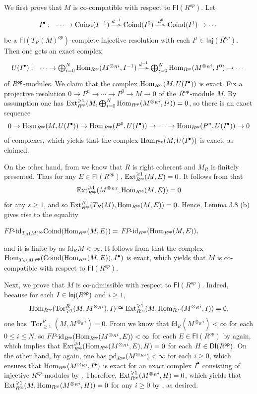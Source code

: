 \documentclass[10pt,twoside]{amsart}
\theoremstyle{bfupright head,slanted body}
\theoremstyle{bfupright head,upright body}
\theoremstyle{fixed bf head,slanted body}
\theoremstyle{fixed bf head,upright body}
\theoremstyle{numbered paragraph}
\newenvironment{prf*}[1][Proof]{%
  \begin{proof}[\bf #1]
    \setcounter{equation}{0}
    \renewcommand{\theequation}{\arabic{equation}}}
  {\end{proof}
  }
\numberwithin{equation}{res}
\newcommand{\DI}{\mathsf{DI}}
\newcommand{\id}{\mathrm{id}}
\newcommand{\fd}{\mathrm{fd}}
\newcommand{\pd}{\mathrm{pd}}
\newcommand{\Inj}{\mathsf{Inj}}
\newcommand{\FI}{\mathsf{FI}}
\newcommand{\Coind}{\mathrm{Coind}}
\newcommand{\Rop}{R^{\sf op}}
\newcommand{\op}{\sf op}
\newcommand{\Hom}{\operatorname{Hom}}
\newcommand{\Ext}{\operatorname{Ext}}
\newcommand{\Tor}{\operatorname{Tor}}
\newcommand{\is}{\cong}
\begin{document}
\begin{prf*}
We first prove that $M$ is co-compatible with respect to $\FI(R^{op})$. Let
$$I^\bullet:\ \xymatrix@C=0.5cm{
\cdots \to \Coind(I^{-1}) \ar[r]^{\quad \,\,\,\,\, d^{-1}} & \Coind(I^0)
\ar[r]^{d^0 \quad \,\,} & \Coind(I^1) \to \cdots}$$
be a $\FI(T_R(M)^{op})$-complete injective resolution with each $I^{j}\in\Inj(R^{op})$. Then one gets an exact complex
$$U(I^\bullet):\ \xymatrix@C=0.5cm{ \cdots \to \bigoplus_{i=0}^N\Hom_{R^{\op}}(M^{\otimes_Ri},I^{-1})
\ar[r]^{\,\, d^{-1}} & \bigoplus_{i=0}^N\Hom_{R^{\op}}(M^{\otimes_Ri},I^{0}) \to \cdots}$$
of $\Rop$-modules.  We claim that the complex $\Hom_{\Rop}(M, U(I^\bullet))$ is exact. Fix a projective resolution $0 \to P^n \to \cdots \to  P^0 \to M \to 0$ of the $\Rop$-module $M$. By assumption one has $\Ext^{\geqslant 1}_{\Rop}(M,\bigoplus_{i=0}^N\Hom_{\Rop}(M^{\otimes_Ri}, I^{j}))=0$, so there is an exact sequence
$$0 \to \Hom_{\Rop}(M, U(I^\bullet)) \to \Hom_{\Rop}(P^0, U(I^\bullet))
\to \cdots \to \Hom_{\Rop}(P^n, U(I^\bullet)) \to 0$$
of complexes, which yields that the complex $\Hom_{\Rop}(M, U(I^\bullet))$ is exact, as claimed.

On the other hand, from \cite[Theorem 3.5]{DL} we know that $R$ is right coherent and $M_{R}$ is finitely presented. 
Thus for any $E\in\FI(R^{op})$, $\Ext_{\Rop}^{\geqslant 1}(M, E)=0$.
It follows from \cite[Lemma 2.15 (ii)]{DL} that
$$\Ext_{\Rop}^{\geqslant 1}(M^{\otimes_Rs},\Hom_{\Rop}(M,E))=0$$
for any $s\geqslant 1$, and so $\Ext_{\Rop}^{\geqslant 1}(T_R(M),\Hom_{\Rop}(M,E))=0$. 
Hence, Lemma 3.8 (b) gives rise to the equality
\begin{center}
$FP$-$\id_{T_R(M)^{\op}}\Coind(\Hom_{\Rop}(M,E))=$ $FP$-$\id_{\Rop}(\Hom_{\Rop}(M, E)),$
\end{center}
and it is finite by \cite[Lemma 4.2]{2022Mao} as $\fd_{R}M<\infty$.
It follows from \cite[Lemma 4.1]{2022Mao} that the complex 
$\Hom_{T_R(M)^{\op}}(\Coind(\Hom_{\Rop}(M,E)), I^\bullet)$ is exact, 
which yields that $M$ is co-compatible  with respect to $\FI(R^{op})$.

Next, we prove that $M$ is co-admissible  with respect to $\FI(R^{op})$.
Indeed, because for each $I \in \Inj(\Rop)$ and $i\geqslant 1$, 
$$\Hom_{\Rop}(\Tor_{\geqslant 1}^R(M, M^{\otimes_Ri}), I)\is\Ext^{\geqslant 1}_{\Rop}(M,\Hom_{\Rop}(M^{\otimes_Ri}, I))=0,$$
one has $\Tor_{\geqslant 1}^R(M, M^{\otimes_Ri})=0$. 
From \cite[Lemma 2.5]{DL} we know that $\fd_{R}(M^{\otimes_Ri})<\infty$ for each $0\leqslant i \leqslant N$, 
so $FP$-$\id_{\Rop}(\Hom_{\Rop}(M^{\otimes_Ri}, E))<\infty$
for each $E\in\FI(R^{op})$ by \cite[Lemma 4.2]{2022Mao} again,
which implies that $\Ext_{\Rop}^{\geqslant 1}(\Hom_{\Rop}(M^{\otimes_Ri}, E),H)=0$
for each $H \in \DI(\Rop)$. On the other hand,
by \cite[Lemma 2.5]{DL} again, one has $\pd_{\Rop}(M^{\otimes_Ri})<\infty$ for each $i\geqslant 0$,
which ensures that $\Hom_{\Rop}(M^{\otimes_Ri}, I^\bullet)$ is exact for an exact complex $I^\bullet$ 
consisting of injective $R^{op}$-modules by \cite[Lemma 2.5]{EIT}.
Therefore, $\Ext_{\Rop}^{\geqslant 1}(M^{\otimes_Ri}, H)=0$, which yields that
$\Ext^{\geqslant 1}_{\Rop}(M,\Hom_{\Rop}(M^{\otimes_Ri},H))=0$ for any $i\geqslant 0$
by \cite[Lemma 2.15 (i)]{DL}, as desired.
\end{prf*}
\end{document}
